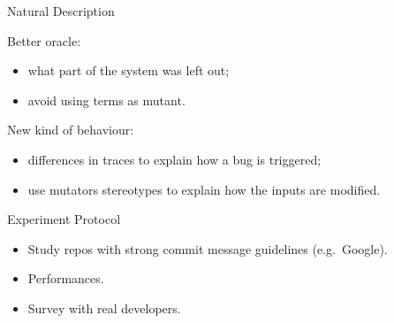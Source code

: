 \documentclass[aspectratio=169]{beamer}
\begin{document}
\begin{frame}{Natural Description}
  \begin{block}{Better oracle:}
    \begin{itemize}
      \item what part of the system was left out;
      \item avoid using terms as mutant.
    \end{itemize}
  \end{block}
  \pause{}
  \begin{block}{New kind of behaviour:}
    \begin{itemize}
      \item differences in traces to explain how a bug is triggered;
      \item use mutators stereotypes to explain how the inputs are modified.
    \end{itemize}
  \end{block}
\end{frame}

\begin{frame}{Experiment Protocol}
  \begin{itemize}[<+->]
    \item Study repos with strong commit message guidelines (e.g.\ Google).
    \item Performances.
    \item Survey with real developers.
  \end{itemize}
\end{frame}
\end{document}
